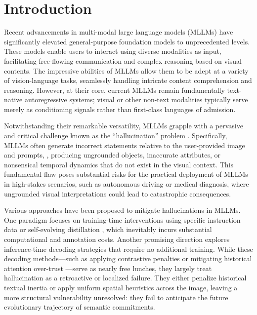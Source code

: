 ﻿\section{Introduction}
\label{sec:intro}

\label{fig:teaser}

Recent advancements in multi-modal large language models (MLLMs) \cite{bai2024qwen2vl,llava_next_video_blog,li2025llava_st} have significantly elevated general-purpose foundation models to unprecedented levels. These models enable users to interact using diverse modalities as input, facilitating free-flowing communication and complex reasoning based on visual contents. The impressive abilities of MLLMs allow them to be adept at a variety of vision-language tasks, seamlessly handling intricate content comprehension and reasoning. However, at their core, current MLLMs remain fundamentally text-native autoregressive systems; visual or other non-text modalities typically serve merely as conditioning signals rather than first-class languages of admission.

Notwithstanding their remarkable versatility, MLLMs grapple with a pervasive and critical challenge known as the ``hallucination'' problem \cite{bai2025mllm_hallucination_survey,li2023pope,rohrbach2018object}. Specifically, MLLMs often generate incorrect statements relative to the user-provided image and prompts, \eg, producing ungrounded objects, inaccurate attributes, or nonsensical temporal dynamics that do not exist in the visual context. This fundamental flaw poses substantial risks for the practical deployment of MLLMs in high-stakes scenarios, such as autonomous driving or medical diagnosis, where ungrounded visual interpretations could lead to catastrophic consequences.

Various approaches have been proposed to mitigate hallucinations in MLLMs. One paradigm focuses on training-time interventions using specific instruction data or self-evolving distillation \cite{anonymous2025_vittle,anonymous2025_identify_isolate_purge}, which inevitably incurs substantial computational and annotation costs. Another promising direction explores inference-time decoding strategies \cite{leng2023mitigating,huang2024opera_cvpr,wang2024deco,wang2025damo,chuang2023dola} that require no additional training. While these decoding methods---such as applying contrastive penalties \cite{leng2023mitigating} or mitigating historical attention over-trust \cite{huang2024opera_cvpr}---serve as nearly free lunches, they largely treat hallucination as a retroactive or localized failure. They either penalize historical textual inertia or apply uniform spatial heuristics across the image, leaving a more structural vulnerability unresolved: they fail to anticipate the future evolutionary trajectory of semantic commitments.

